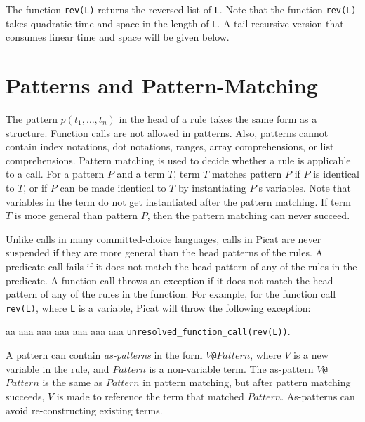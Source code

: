The function \texttt{rev(L)} returns the reversed list of \texttt{L}. Note that the function \texttt{rev(L)} takes quadratic time and space in the length of \texttt{L}. A tail-recursive version that consumes linear time and space will be given below.

\section{Patterns and Pattern-Matching}
The pattern $p(t_1,\ldots,t_n)$ in the head of a rule takes the same form as a structure. Function calls are not allowed in patterns. Also, patterns cannot contain index notations, dot notations, ranges, array comprehensions, or list comprehensions. Pattern matching is used to decide whether a rule is applicable to a call. For a pattern $P$ and a term $T$, term $T$ matches pattern $P$ if $P$ is identical to $T$, or if $P$ can be made identical to $T$ by instantiating $P$'s variables. Note that variables in the term do not get instantiated after the pattern matching. If term $T$ is more general than pattern $P$, then the pattern matching can never succeed.

Unlike calls in many committed-choice languages, calls in Picat are never suspended if they are more general than the head patterns of the rules. A predicate call fails if it does not match the head pattern of any of the rules in the predicate. A function call throws an exception if it does not match the head pattern of any of the rules in the function. For example, for the function call \texttt{rev(L)}, where \texttt{L} is a variable, Picat will throw the following exception:

\begin{tabbing}
aa \= aaa \= aaa \= aaa \= aaa \= aaa \= aaa \kill
\> \> \texttt{unresolved\_function\_call(rev(L))}.
\end{tabbing}

A pattern can contain \emph{as-patterns} in the form \texttt{$V$@$Pattern$}, where $V$ is a new variable in the rule, and $Pattern$ is a non-variable term. The as-pattern \texttt{$V$@$Pattern$} is the same as \texttt{$Pattern$} in pattern matching, but after pattern matching succeeds, $V$ is made to reference the term that matched $Pattern$. As-patterns can avoid re-constructing existing terms.

